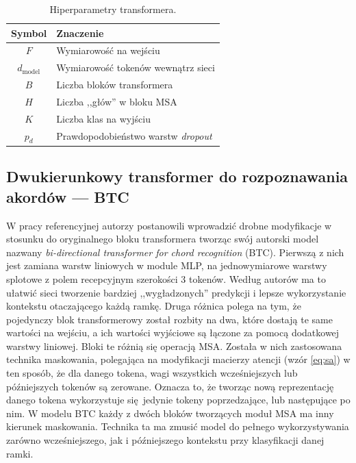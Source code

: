 \begin{table}
    \centering
    \caption{Hiperparametry transformera.}
    \label{tab:transformer_params}
    \begin{tabular}{|c|l|} \hline
        Symbol & Znaczenie \\ \hline
        $F$ & Wymiarowość na wejściu \\
        $d_{\mathrm{model}}$ & Wymiarowość tokenów wewnątrz sieci \\
        $B$ & Liczba bloków transformera \\
        $H$ & Liczba ,,głów'' w bloku MSA \\
        $K$ & Liczba klas na wyjściu \\
        $p_d$ & Prawdopodobieństwo warstw \emph{dropout} \\ \hline
    \end{tabular}
\end{table}

\subsection{Dwukierunkowy transformer do rozpoznawania akordów --- BTC}

W pracy referencyjnej \cite{park_bi-directional_2019} autorzy postanowili wprowadzić drobne modyfikacje w stosunku do oryginalnego bloku transformera tworząc swój autorski model nazwany \emph{bi-directional transformer for chord recognition} (BTC). Pierwszą z nich jest zamiana warstw liniowych w module MLP, na jednowymiarowe warstwy splotowe z polem recepcyjnym szerokości 3 tokenów.  Według autorów ma to ułatwić sieci tworzenie bardziej ,,wygładzonych'' predykcji i lepsze wykorzystanie kontekstu otaczającego każdą ramkę. Druga różnica polega na tym, że pojedynczy blok transformerowy został rozbity na dwa, które dostają te same wartości na wejściu, a ich wartości wyjściowe są łączone za pomocą dodatkowej warstwy liniowej. Bloki te różnią się operacją MSA.  Została w nich zastosowana technika maskowania, polegająca na modyfikacji macierzy atencji (wzór \ref{eq:sa}) w ten sposób, że dla danego tokena, wagi wszystkich wcześniejszych lub późniejszych tokenów są zerowane. Oznacza to, że tworząc nową reprezentację danego tokena wykorzystuje się jedynie tokeny poprzedzające, lub następujące po nim. W modelu BTC każdy z dwóch bloków tworzących moduł MSA ma inny kierunek maskowania. Technika ta ma zmusić model do pełnego wykorzystywania zarówno wcześniejszego, jak i późniejszego kontekstu przy klasyfikacji danej ramki.



